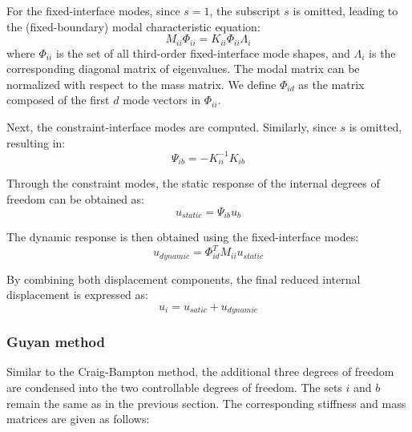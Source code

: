 \documentclass[a4paper, 10pt, conference]{ieeeconf}      %
\begin{document}
For the fixed-interface modes, since $s = 1$, the subscript $s$ is omitted, leading to the (fixed-boundary) modal characteristic equation:
\begin{equation}
    M_{ii} \Phi_{ii} = K_{ii} \Phi_{ii} \Lambda_{i}
\end{equation}
where $\Phi_{ii} $ is the set of all third-order fixed-interface mode shapes, and $ \Lambda_{i}$ is the corresponding diagonal matrix of eigenvalues. The modal matrix can be normalized with respect to the mass matrix. We define $\Phi_{id}$ as the matrix composed of the first $d$ mode vectors in $\Phi_{ii}$.

Next, the constraint-interface modes are computed. Similarly, since $s$ is omitted, resulting in:
\begin{equation}
    \Psi_{ib} = -K^{-1}_{ii}K_{ib}
\end{equation}

Through the constraint modes, the static response of the internal degrees of freedom can be obtained as:
\begin{equation}
    u_{static} = \Psi_{ib} u_b
\end{equation}

The dynamic response is then obtained using the fixed-interface modes:
\begin{equation}
    u_{dynamic} = \Phi^T_{id}M_{ii}u_{static}
\end{equation} 

By combining both displacement components, the final reduced internal displacement is expressed as:
\begin{equation}
    u_i = u_{satic} + u_{dynamic}
\end{equation}

\subsubsection{Guyan method} \label{sec331}

Similar to the Craig-Bampton method, the additional three degrees of freedom are condensed into the two controllable degrees of freedom. The sets \( i \) and \( b \) remain the same as in the previous section. The corresponding stiffness and mass matrices are given as follows:
\end{document}
